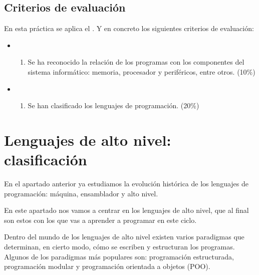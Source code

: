 \documentclass[letterpaper,10pt,spanish]{sphinxmanual}
\begin{document}
\section{Criterios de evaluación}
\label{\detokenize{practica1:criterios-de-evaluacion}}
\sphinxAtStartPar
En esta práctica se aplica el . Y en concreto los siguientes criterios de evaluación:
\begin{itemize}
\item {} \begin{enumerate}
%
\item {} 
\sphinxAtStartPar
Se ha reconocido la relación de los programas con los componentes del sistema informático: memoria, procesador y periféricos,  entre otros. (10\%)

\end{enumerate}

\item {} \begin{enumerate}
%
\setcounter{enumi}{4}
\item {} 
\sphinxAtStartPar
Se han clasificado los lenguajes de programación. (20\%)

\end{enumerate}

\end{itemize}

\sphinxstepscope


\chapter{Lenguajes de alto nivel: clasificación}
\label{\detokenize{lenguajes_alto_nivel_clasificacion:lenguajes-de-alto-nivel-clasificacion}}\label{\detokenize{lenguajes_alto_nivel_clasificacion::doc}}
\sphinxAtStartPar
En el apartado anterior ya estudiamos la evolución histórica de los lenguajes de programación: máquina, ensamblador y alto nivel.

\sphinxAtStartPar
En este apartado nos vamos a centrar en los lenguajes de alto nivel, que al final son estos con los que vas a aprender a programar en este ciclo.

\sphinxAtStartPar
Dentro del mundo de los lenguajes de alto nivel existen varios paradigmas que determinan, en cierto modo, cómo se escriben y estructuran los programas. Algunos de los paradigmas más populares son: programación estructurada, programación modular y programación orientada a objetos (POO).
\end{document}
